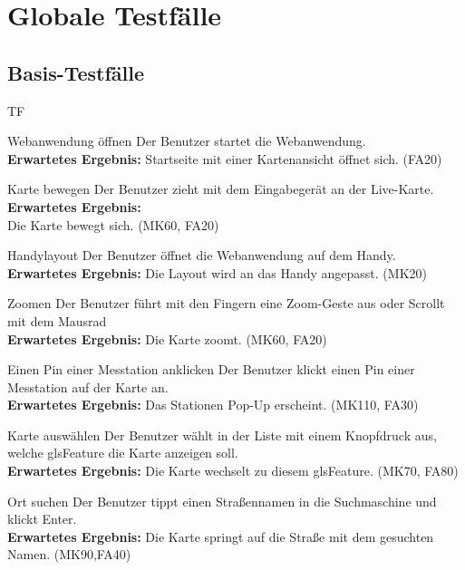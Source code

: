 \section{Globale Testfälle}
\setcounter{counter}{10}
\subsection{Basis-Testfälle}
\begin{Kriterien}{TF}

	
	\item[Webanwendung öffnen] Der Benutzer startet die \gls{Webanwendung}. \\ \textbf{Erwartetes Ergebnis:} Startseite mit einer Kartenansicht öffnet sich. (FA20)

	\item[Karte bewegen] Der Benutzer zieht mit dem Eingabegerät an der \gls{Live-Karte}. \textbf{Erwartetes Ergebnis:} \\ Die Karte bewegt sich.  (MK60, FA20)
    
    \item[Handylayout] Der Benutzer öffnet die Webanwendung auf dem Handy. \\ \textbf{Erwartetes Ergebnis:} Die Layout wird an das Handy angepasst. (MK20)
	
	\item[Zoomen] Der Benutzer führt mit den Fingern eine Zoom-Geste aus oder Scrollt mit dem Mausrad \\ \textbf{Erwartetes Ergebnis:} Die Karte zoomt. (MK60, FA20)
	
	\item[Einen Pin einer Messtation anklicken] Der Benutzer klickt einen Pin einer Messtation auf der Karte an. \\ \textbf{Erwartetes Ergebnis:} Das Stationen Pop-Up erscheint. (MK110,  FA30)
	
	\item[Karte auswählen] Der Benutzer wählt in der Liste mit einem Knopfdruck aus, welche gls{Feature} die Karte anzeigen soll. \\ \textbf{Erwartetes Ergebnis:} Die Karte wechselt zu diesem gls{Feature}. (MK70, FA80)
	
	\item[Ort suchen] Der Benutzer tippt einen Straßennamen in die Suchmaschine und klickt Enter. \\ \textbf{Erwartetes Ergebnis:} Die Karte springt auf die Straße mit dem gesuchten Namen. (MK90,FA40)
	

\end{Kriterien}
